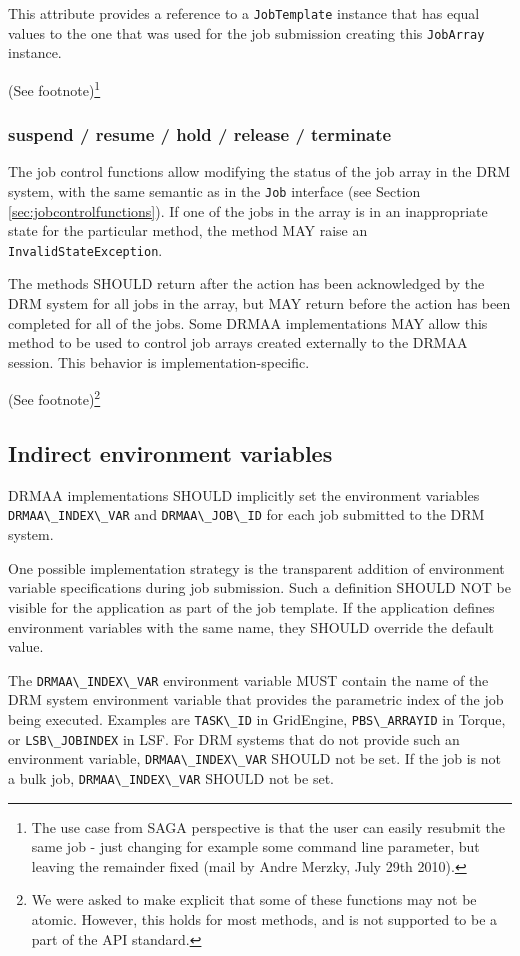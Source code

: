\documentclass{article}
\newcommand{\h}[1]{\lstinline|#1|}
\newcommand{\rat}[1]{ {\tiny(See footnote)}\footnote{#1} }
\begin{document}
This attribute provides a reference to a \h{JobTemplate} instance that has equal values to the one that was used for the job submission creating this \h{JobArray} instance. 

\rat{
The use case from SAGA perspective is that the user can easily resubmit the same job - just changing for example some command line parameter, but leaving the remainder fixed (mail by Andre Merzky, July 29th 2010).  
}

\subsubsection{suspend / resume / hold / release / terminate}

The job control functions allow modifying the status of the job array in the DRM system, with the same semantic as in the \h{Job} interface (see Section \ref{sec:jobcontrolfunctions}). If one of the jobs in the array is in an inappropriate state for the particular method, the method MAY raise an \h{InvalidStateException}.

The methods SHOULD return after the action has been acknowledged by the DRM system for all jobs in the array, but MAY return before the action has been completed for all of the jobs. Some DRMAA implementations MAY allow this method to be used to control job arrays created externally to the DRMAA session. This behavior is implementation-specific.

\rat{We were asked to make explicit that some of these functions may not be atomic. However, this holds for most methods, and is not supported to be a part of the API standard.}

\subsection{Indirect environment variables}
\label{sec:drmaaindex}

DRMAA implementations SHOULD implicitly set the environment variables \h{DRMAA\_INDEX\_VAR} and \h{DRMAA\_JOB\_ID} for each job submitted to the DRM system. 

One possible implementation strategy is the transparent addition of environment variable specifications during job submission. Such a definition SHOULD NOT be visible for the application as part of the job template. If the application defines environment variables with the same name, they SHOULD override the default value. 

The \h{DRMAA\_INDEX\_VAR} environment variable MUST contain the name of the DRM system environment variable that provides the parametric index of the job being executed. Examples are \h{TASK\_ID} in GridEngine, \h{PBS\_ARRAYID} in Torque, or \h{LSB\_JOBINDEX} in LSF. For DRM systems that do not provide such an environment variable,  \h{DRMAA\_INDEX\_VAR} SHOULD not be set. If the job is not a bulk job,  \h{DRMAA\_INDEX\_VAR} SHOULD not be set.
\end{document}
